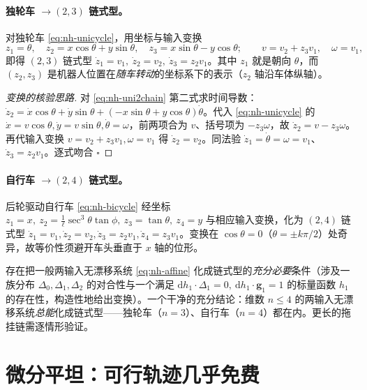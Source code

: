 \paragraph{独轮车 $\to(2,3)$ 链式型。}
对独轮车 \cref{eq:nh-unicycle}，用坐标与输入变换
\begin{equation}
  z_1=\theta,\quad z_2=x\cos\theta+y\sin\theta,\quad z_3=x\sin\theta-y\cos\theta;
  \qquad v=v_2+z_3 v_1,\quad \omega=v_1,
  \label{eq:nh-uni2chain}
\end{equation}
即得 $(2,3)$ 链式型 $\dot z_1=v_1,\ \dot z_2=v_2,\ \dot z_3=z_2 v_1$。其中 $z_1$ 就是朝向 $\theta$，而 $(z_2,z_3)$ 是机器人位置在\emph{随车转动}的坐标系下的表示（$z_2$ 轴沿车体纵轴）。

\begin{proof}[变换的核验思路]
对 \cref{eq:nh-uni2chain} 第二式求时间导数：$\dot z_2=\dot x\cos\theta+\dot y\sin\theta+(-x\sin\theta+y\cos\theta)\dot\theta$。代入 \cref{eq:nh-unicycle} 的 $\dot x=v\cos\theta,\dot y=v\sin\theta,\dot\theta=\omega$，前两项合为 $v$、括号项为 $-z_3\omega$，故 $\dot z_2=v-z_3\omega$。再代输入变换 $v=v_2+z_3v_1,\omega=v_1$ 得 $\dot z_2=v_2$。同法验 $\dot z_1=\dot\theta=\omega=v_1$、$\dot z_3=z_2 v_1$。逐式吻合 $\square$
\end{proof}

\paragraph{自行车 $\to(2,4)$ 链式型。}
后轮驱动自行车 \cref{eq:nh-bicycle} 经坐标 $z_1=x,\ z_2=\frac{1}{\ell}\sec^3\theta\tan\phi,\ z_3=\tan\theta,\ z_4=y$ 与相应输入变换，化为 $(2,4)$ 链式型 $\dot z_1=v_1,\dot z_2=v_2,\dot z_3=z_2 v_1,\dot z_4=z_3 v_1$。变换在 $\cos\theta=0$（$\theta=\pm k\pi/2$）处奇异，故等价性须避开车头垂直于 $x$ 轴的位形。

\begin{note}[何时一定能化成链式型]\label{note:nh-chainable}
存在把一般两输入无漂移系统 \cref{eq:nh-affine} 化成链式型的\emph{充分必要}条件（涉及一族分布 $\Delta_0,\Delta_1,\Delta_2$ 的对合性与一个满足 $\mathrm{d}h_1\cdot\Delta_1=0,\ \mathrm{d}h_1\cdot\mathbf{g}_1=1$ 的标量函数 $h_1$ 的存在性，构造性地给出变换\cite{murray1993sinusoids}）。一个干净的充分结论：维数 $n\le4$ 的两输入无漂移系统\emph{总能}化成链式型——独轮车（$n=3$）、自行车（$n=4$）都在内。更长的拖挂链需逐情形验证。
\end{note}

\section{微分平坦：可行轨迹几乎免费}
\label{sec:nh-flat}

